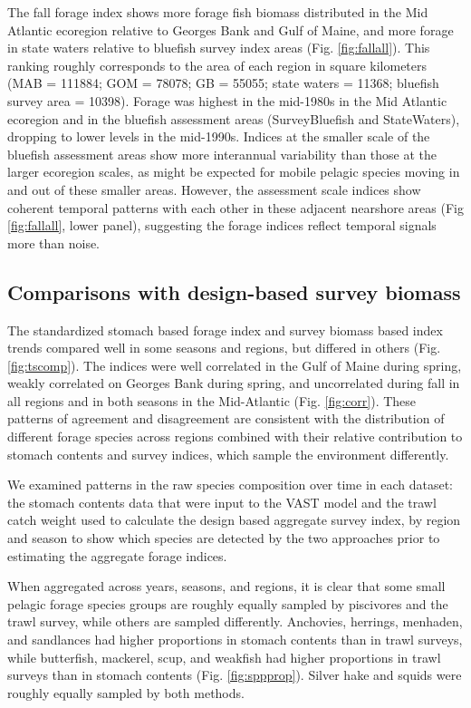 \documentclass[
]{article}
\begin{document}
The fall forage index shows more forage fish biomass distributed in the Mid Atlantic ecoregion relative to Georges Bank and Gulf of Maine, and more forage in state waters relative to bluefish survey index areas (Fig. \ref{fig:fallall}). This ranking roughly corresponds to the area of each region in square kilometers (MAB = 111884; GOM = 78078; GB = 55055; state waters = 11368; bluefish survey area = 10398). Forage was highest in the mid-1980s in the Mid Atlantic ecoregion and in the bluefish assessment areas (SurveyBluefish and StateWaters), dropping to lower levels in the mid-1990s. Indices at the smaller scale of the bluefish assessment areas show more interannual variability than those at the larger ecoregion scales, as might be expected for mobile pelagic species moving in and out
of these smaller areas. However, the assessment scale indices show coherent temporal patterns with each other in these adjacent nearshore areas (Fig \ref{fig:fallall}, lower panel), suggesting the forage indices reflect temporal signals more than noise.

\hypertarget{comparisons-with-design-based-survey-biomass}{%
\subsection{Comparisons with design-based survey biomass}\label{comparisons-with-design-based-survey-biomass}}

The standardized stomach based forage index and survey biomass based index trends compared well in some seasons and regions, but differed in others (Fig. \ref{fig:tscomp}). The indices were well correlated in the Gulf of Maine during spring, weakly correlated on Georges Bank during spring, and uncorrelated during fall in all regions and in both seasons in the Mid-Atlantic (Fig. \ref{fig:corr}). These patterns of agreement and disagreement are consistent with the distribution of different forage species across regions combined with their relative contribution to stomach contents and survey indices, which sample the environment differently.

We examined patterns in the raw species composition over time in each dataset: the stomach contents data that were input to the VAST model and the trawl catch weight used to calculate the design based aggregate survey index, by region and season to show which species are detected by the two approaches prior to estimating the aggregate forage indices.

When aggregated across years, seasons, and regions, it is clear that some small pelagic forage species groups are roughly equally sampled by piscivores and the trawl survey, while others are sampled differently. Anchovies, herrings, menhaden, and sandlances had higher proportions in stomach contents than in trawl surveys, while butterfish, mackerel, scup, and weakfish had higher proportions in trawl surveys than in stomach contents (Fig. \ref{fig:sppprop}). Silver hake and squids were roughly equally sampled by both methods.
\end{document}
